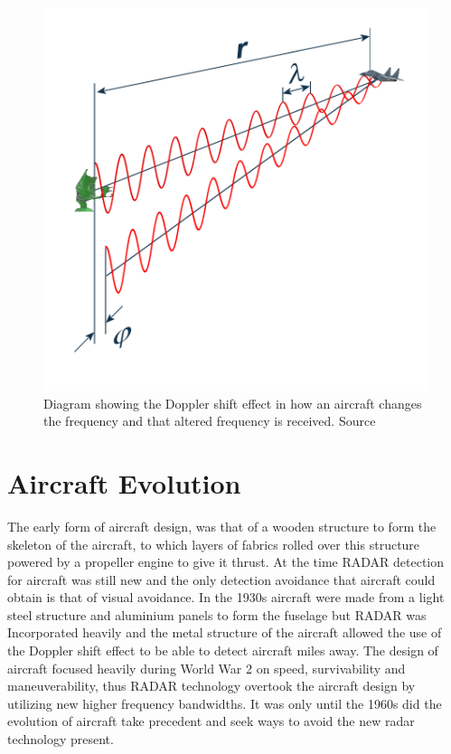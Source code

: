 \documentclass[12pt]{article}
\begin{document}
\begin{figure}[H]
\centering
\includegraphics[scale=0.4]{Images/Doppler.png}
\caption{Diagram showing the Doppler shift effect in how an aircraft changes the frequency and that altered frequency is received. Source \cite{Doppler}}
\label{Doppler}
\end{figure}

\section{Aircraft Evolution}
\label{Aircraft Evolution Section}

The early form of aircraft design, was that of a wooden structure to form the skeleton of the aircraft, to which layers of fabrics rolled over this structure powered by a propeller engine to give it thrust. At the time RADAR detection for aircraft was still new and the only detection avoidance that aircraft could obtain is that of visual avoidance. In the 1930s aircraft were made from a light steel structure and aluminium panels to form the fuselage but RADAR was Incorporated heavily and the metal structure of the aircraft allowed the use of the Doppler shift effect to be able to detect aircraft miles away. The design of aircraft focused heavily during World War 2 on speed, survivability and maneuverability, thus RADAR technology overtook the aircraft design by utilizing new higher frequency bandwidths. It was only until the 1960s did the evolution of aircraft take precedent and seek ways to avoid the new radar technology present.
\end{document}
